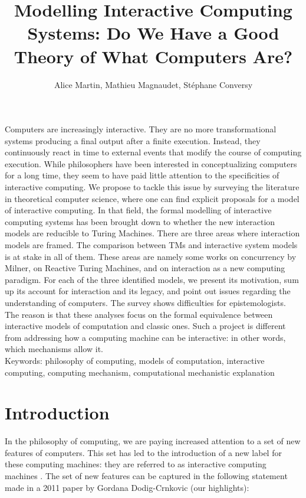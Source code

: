 \documentclass[a4paper, 11pt, twoside]{article}
\title{Modelling Interactive Computing Systems: Do We Have a Good Theory of What Computers Are?}
\author{Alice Martin, Mathieu Magnaudet, Stéphane Conversy}
\begin{document}
\maketitle

Computers are increasingly interactive. They are no more transformational systems producing a final output after a finite execution. Instead, they continuously react in time to external events that modify the course of computing execution. While philosophers have been interested in conceptualizing computers for a long time, they seem to have paid little attention to the specificities of interactive computing. We propose to tackle this issue by surveying the literature in theoretical computer science, where one can find explicit proposals for a model of interactive computing. 
In that field, the formal modelling of interactive computing systems has been brought down to whether the new interaction models are reducible to Turing Machines. There are three areas where interaction models are framed. The comparison between TMs and interactive system models is at stake in all of them. These areas are namely some works on concurrency by Milner, on Reactive Turing Machines, and on interaction as a new computing paradigm. For each of the three identified models, we present its motivation, sum up its account for interaction and its legacy, and point out issues regarding the understanding of computers. The survey shows difficulties for epistemologists. The reason is that these analyses focus on the formal equivalence between interactive models of computation and classic ones. Such a project is different from addressing how a computing machine can be interactive: in other words, which mechanisms allow it. \\


Keywords: philosophy of computing, models of computation, interactive computing, computing mechanism, computational mechanistic explanation


\section*{Introduction}

In the philosophy of computing, we are paying increased attention to a set of new features of computers. This set has led to the introduction of a new label for these computing machines: they are referred to as interactive computing machines \parencite{Dodig-Crnkovic2011, Goldin2006, Soare2013, VanLeeuwen2001, Wegner1997}. The set of new features can be captured in the following statement made in a 2011 paper by Gordana Dodig-Crnkovic (our highlights): 
\end{document}
